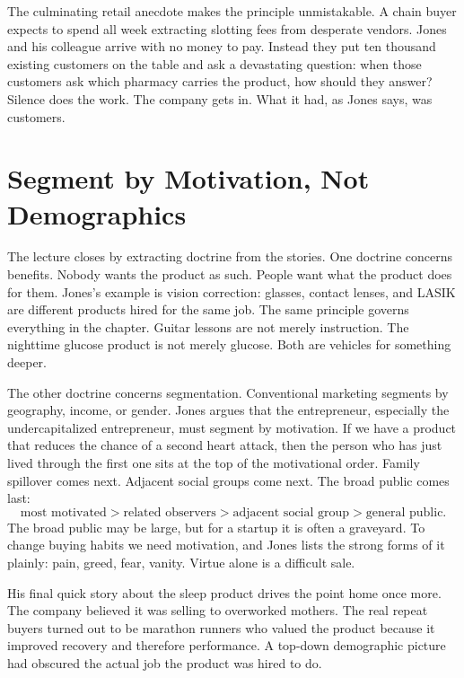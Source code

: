 The culminating retail anecdote makes the principle unmistakable. A chain buyer expects to spend all week extracting slotting fees from desperate vendors. Jones and his colleague arrive with no money to pay. Instead they put ten thousand existing customers on the table and ask a devastating question: when those customers ask which pharmacy carries the product, how should they answer? Silence does the work. The company gets in. What it had, as Jones says, was customers.

\section{Segment by Motivation, Not Demographics}

The lecture closes by extracting doctrine from the stories. One doctrine concerns benefits. Nobody wants the product as such. People want what the product does for them. Jones's example is vision correction: glasses, contact lenses, and LASIK are different products hired for the same job. The same principle governs everything in the chapter. Guitar lessons are not merely instruction. The nighttime glucose product is not merely glucose. Both are vehicles for something deeper.

The other doctrine concerns segmentation. Conventional marketing segments by geography, income, or gender. Jones argues that the entrepreneur, especially the undercapitalized entrepreneur, must segment by motivation. If we have a product that reduces the chance of a second heart attack, then the person who has just lived through the first one sits at the top of the motivational order. Family spillover comes next. Adjacent social groups come next. The broad public comes last:
\begin{equation}
\text{most motivated}
>
\text{related observers}
>
\text{adjacent social group}
>
\text{general public}.
\end{equation}
The broad public may be large, but for a startup it is often a graveyard. To change buying habits we need motivation, and Jones lists the strong forms of it plainly: pain, greed, fear, vanity. Virtue alone is a difficult sale.

His final quick story about the sleep product drives the point home once more. The company believed it was selling to overworked mothers. The real repeat buyers turned out to be marathon runners who valued the product because it improved recovery and therefore performance. A top-down demographic picture had obscured the actual job the product was hired to do.


